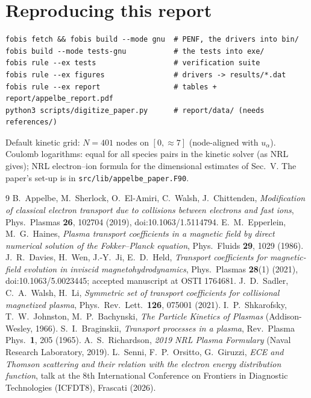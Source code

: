 \documentclass[11pt,a4paper]{article}
\begin{document}
\appendix
\section{Reproducing this report}
\begin{verbatim}
fobis fetch && fobis build --mode gnu  # PENF, the drivers into bin/
fobis build --mode tests-gnu           # the tests into exe/
fobis rule --ex tests                  # verification suite
fobis rule --ex figures                # drivers -> results/*.dat
fobis rule --ex report                 # tables + report/appelbe_report.pdf
python3 scripts/digitize_paper.py      # report/data/ (needs references/)
\end{verbatim}
Default kinetic grid: $N=401$ nodes on $[0,\approx7]$ (node-aligned with $u_\alpha$). Coulomb logarithms: equal for all
species pairs in the kinetic solver (as NRL gives); NRL electron--ion formula for the dimensional estimates of Sec.~V.
The paper's set-up is in \texttt{src/lib/appelbe\_paper.F90}.

\begin{thebibliography}{9}
 B.~Appelbe, M.~Sherlock, O.~El-Amiri, C.~Walsh, J.~Chittenden, \emph{Modification of classical
   electron transport due to collisions between electrons and fast ions}, Phys.\ Plasmas \textbf{26}, 102704 (2019),
   doi:10.1063/1.5114794.
 E.~M.~Epperlein, M.~G.~Haines, \emph{Plasma transport coefficients in a magnetic field by direct
   numerical solution of the Fokker--Planck equation}, Phys.\ Fluids \textbf{29}, 1029 (1986).
 J.~R.~Davies, H.~Wen, J.-Y.~Ji, E.~D.~Held, \emph{Transport coefficients for magnetic-field evolution
   in inviscid magnetohydrodynamics}, Phys.\ Plasmas \textbf{28}(1) (2021), doi:10.1063/5.0023445; accepted manuscript at
   OSTI 1764681.
 J.~D.~Sadler, C.~A.~Walsh, H.~Li, \emph{Symmetric set of transport coefficients for collisional
   magnetized plasma}, Phys.\ Rev.\ Lett.\ \textbf{126}, 075001 (2021).
 I.~P.~Shkarofsky, T.~W.~Johnston, M.~P.~Bachynski, \emph{The Particle Kinetics of Plasmas}
   (Addison-Wesley, 1966).
 S.~I.~Braginskii, \emph{Transport processes in a plasma}, Rev.\ Plasma Phys.\ \textbf{1}, 205 (1965).
 A.~S.~Richardson, \emph{2019 NRL Plasma Formulary} (Naval Research Laboratory, 2019).
 L.~Senni, F.~P.~Orsitto, G.~Giruzzi, \emph{ECE and Thomson scattering and their relation with the
   electron energy distribution function}, talk at the 8th International Conference on Frontiers in Diagnostic
   Technologies (ICFDT8), Frascati (2026).
\end{thebibliography}
\end{document}
